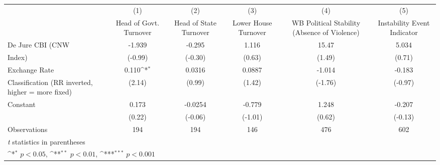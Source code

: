 {
\def\sym#1{\ifmmode^{#1}\else\(^{#1}\)\fi}
\begin{tabular}{l*{5}{c}}
\toprule
                &\multicolumn{1}{c}{(1)}&\multicolumn{1}{c}{(2)}&\multicolumn{1}{c}{(3)}&\multicolumn{1}{c}{(4)}&\multicolumn{1}{c}{(5)}\\
                &\multicolumn{1}{c}{Head of Govt. Turnover}&\multicolumn{1}{c}{Head of State Turnover}&\multicolumn{1}{c}{Lower House Turnover}&\multicolumn{1}{c}{WB Political Stability (Absence of Violence)}&\multicolumn{1}{c}{Instability Event Indicator}\\
\midrule
De Jure CBI (CNW&   -1.939         &   -0.295         &    1.116         &    15.47         &    5.034         \\
Index)          &  (-0.99)         &  (-0.30)         &   (0.63)         &   (1.49)         &   (0.71)         \\
\addlinespace
Exchange Rate   &    0.110\sym{*}  &   0.0316         &   0.0887         &   -1.014         &   -0.183         \\
Classification (RR inverted, higher = more fixed)&   (2.14)         &   (0.99)         &   (1.42)         &  (-1.76)         &  (-0.97)         \\
\addlinespace
Constant        &    0.173         &  -0.0254         &   -0.779         &    1.248         &   -0.207         \\
                &   (0.22)         &  (-0.06)         &  (-1.01)         &   (0.62)         &  (-0.13)         \\
\midrule
Observations    &      194         &      194         &      146         &      476         &      602         \\
\bottomrule
\multicolumn{6}{l}{\footnotesize \textit{t} statistics in parentheses}\\
\multicolumn{6}{l}{\footnotesize \sym{*} \(p<0.05\), \sym{**} \(p<0.01\), \sym{***} \(p<0.001\)}\\
\end{tabular}
}
